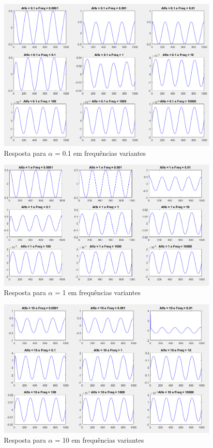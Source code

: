 \documentclass[a4paper, 12pt]{article}
\begin{document}
			\begin{figure}[!ht]
				\centering
				\includegraphics[scale=0.48]{img/3k_alfa3.png}
				\caption{Resposta para $\alpha$ = 0.1 em frequências variantes}	
			\end{figure}				
			\begin{figure}[!ht]
				\centering
				\includegraphics[scale=0.52]{img/3k_alfa4.png}
				\caption{Resposta para $\alpha$ = 1 em frequências variantes}	
			\end{figure}		
			\begin{figure}[!ht]
				\centering
				\includegraphics[scale=0.52]{img/3k_alfa5.png}
				\caption{Resposta para $\alpha$ = 10 em frequências variantes}	
			\end{figure}		
\end{document}
